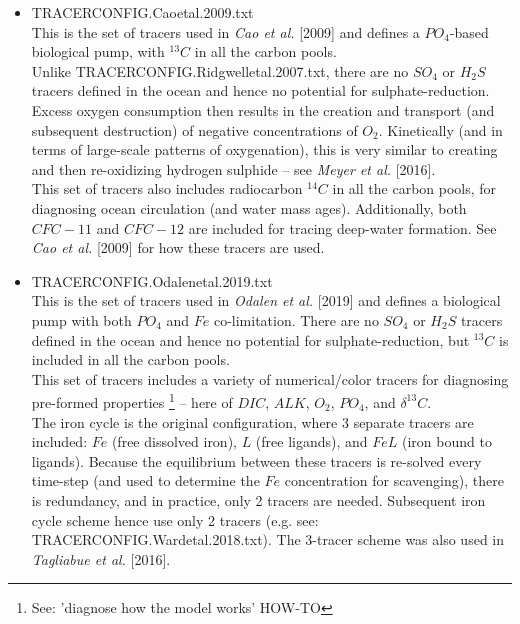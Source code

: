 \begin{itemize}[noitemsep]
\vspace{2mm}
\item \textsf{\small TRACERCONFIG.Caoetal.2009.txt}
\vspace{1mm}
\\This is the set of tracers used in \textit{Cao et al.} [2009] and defines a \(PO_{4}\)-based biological pump, with \(^{13}C\) in all the carbon pools. \\Unlike \textsf{\footnotesize TRACERCONFIG.Ridgwelletal.2007.txt}, there are no \(SO_{4}\) or \(H_{2}S\) tracers defined in the ocean and hence no potential for sulphate-reduction. Excess oxygen consumption then results in the creation and transport (and subsequent destruction) of negative concentrations of \(O_{2}\). Kinetically (and in terms of large-scale patterns of oxygenation), this is very similar to creating and then re-oxidizing hydrogen sulphide -- see \textit{Meyer et al.} [2016].
\\This set of tracers also includes radiocarbon \(^{14}C\) in all the carbon pools, for diagnosing ocean circulation (and water mass ages). Additionally, both \(CFC-11\) and \(CFC-12\) are included for tracing deep-water formation. See \textit{Cao et al.} [2009] for how these tracers are used.

\vspace{2mm}
\item \textsf{\small TRACERCONFIG.Odalenetal.2019.txt}
\vspace{1mm}
\\This is the set of tracers used in \textit{Odalen et al.} [2019] and defines a biological pump with both \(PO_{4}\) and \(Fe\) co-limitation. There are no \(SO_{4}\) or \(H_{2}S\) tracers defined in the ocean and hence no potential for sulphate-reduction, but \(^{13}C\) is included in all the carbon pools.
\\This set of tracers includes a variety of numerical/color tracers for diagnosing pre-formed properties \footnote{See: 'diagnose how the model works' HOW-TO} -- here of \(DIC\), \(ALK\), \(O_{2}\), \(PO_{4}\), and \(\delta^{13}C\).
\\The iron cycle is the original configuration, where 3 separate tracers are included: \(Fe\) (free dissolved iron), \(L\) (free ligands), and \(FeL\) (iron bound to ligands). Because the equilibrium between these tracers is re-solved every time-step (and used to determine the \(Fe\) concentration for scavenging), there is redundancy, and in practice, only 2 tracers are needed. Subsequent iron cycle scheme hence use only 2 tracers (e.g. see: \textsf{\footnotesize TRACERCONFIG.Wardetal.2018.txt}). The 3-tracer scheme was also used in \textit{Tagliabue et al.} [2016].


\end{itemize}
